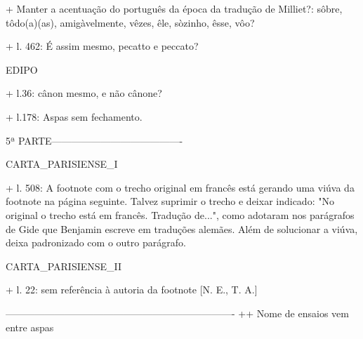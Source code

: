 + Manter a acentuação do português da época da tradução de Milliet?: sôbre, tôdo(a)(as), amigàvelmente, vêzes, êle, sòzinho, êsse, vôo?

+ l. 462: É assim mesmo, pecatto e peccato?

EDIPO

+ l.36: cânon mesmo, e não cânone?

+ l.178: Aspas sem fechamento.


5ª PARTE----------------------------------------

CARTA_PARISIENSE_I

+ l. 508: A footnote com o trecho original em francês está gerando uma viúva da footnote na página seguinte. Talvez suprimir o trecho e deixar indicado: "No original o trecho está em francês. Tradução de...", como adotaram nos parágrafos de Gide que Benjamin escreve em traduções alemães. Além de solucionar a viúva, deixa padronizado com o outro parágrafo.


CARTA_PARISIENSE_II

+ l. 22: sem referência à autoria da footnote [N. E., T. A.]



----------------------------------------------------------------------
++ Nome de ensaios vem entre aspas